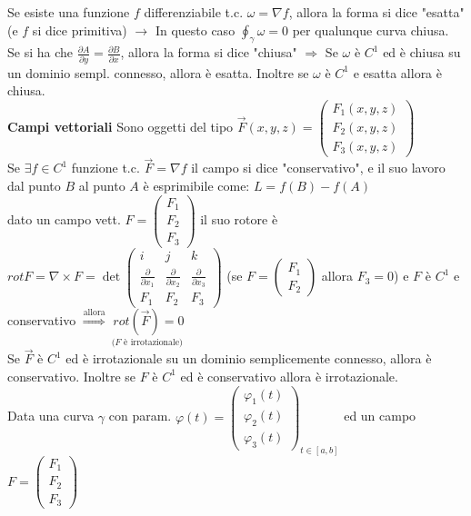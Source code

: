 \documentclass[a4paper, oneside]{article}
\newcommand\de{\partial}
\newcommand\bulletout  {\labelitemfont \textbullet}
\begin{document}
Se esiste una funzione $f$ differenziabile t.c. $\omega = \nabla f$, allora la forma si dice "esatta" (e $f$ si dice primitiva) $\rightarrow$ In questo caso $\oint_{\gamma} \omega=0$ per qualunque curva chiusa. \\
Se si ha che $\frac{\de A}{\de y} = \frac{\de B}{\de x}$, allora la forma si dice "chiusa" $\Rightarrow$ Se $\omega$ è $C^1$ ed è chiusa su un dominio sempl. connesso, allora è esatta. Inoltre se $\omega$ è $C^1$ e esatta allora è chiusa.\\
\textbf{Campi vettoriali}
Sono oggetti del tipo $\vec{F}(x,y,z) = \begin{pmatrix}
    F_1(x,y,z) \\
    F_2(x,y,z) \\
    F_3(x,y,z)
\end{pmatrix}$ \\
\bulletout Se $\exists f\in C^1$ funzione t.c. $\vec{F} = \nabla f$ il campo si dice "conservativo", e il suo lavoro dal punto $B$ al punto $A$ è esprimibile come: $L = f(B) - f(A)$ \\
dato un campo vett. $F = \begin{pmatrix}
    F_1\\
    F_2\\
    F_3
\end{pmatrix}$ il suo rotore è $rot F = \nabla \times F =
\det\begin{pmatrix}
    i & j & k\\
    \frac{\partial}{\partial x_1} & \frac{\partial}{\partial x_2} & \frac{\partial}{\partial x_3}\\
    F_1 & F_2 & F_3
\end{pmatrix}$ (se $F=\begin{pmatrix}
    F_1\\
        F_2
    \end{pmatrix}$ allora $F_3 =0$) e  $F$ è $C^1$ e conservativo $\overset{\text{allora}}{\Rightarrow} \ \underset{\text{($F$ è irrotazionale) }}{rot (\vec{F}) = 0}$ \\
    \bulletout Se $\vec{F}$ è $C^1$ ed è irrotazionale su un dominio semplicemente connesso, allora è conservativo. Inoltre se $F$ è $C^1$ ed è conservativo allora è irrotazionale.\\
    Data una curva $\gamma$ con param. $\varphi(t)=\begin{pmatrix}
        \varphi_1 (t) \\
        \varphi_2 (t) \\
        \varphi_3 (t)
    \end{pmatrix}_{t\in [a,b]}$ ed un campo $F=\begin{pmatrix}
        F_1 \\
        F_2 \\
        F_3
    \end{pmatrix}$
\end{document}
